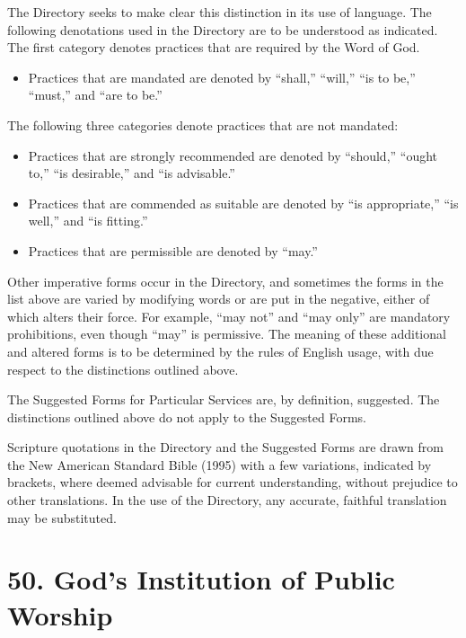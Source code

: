 \documentclass[
]{book}
\providecommand{\tightlist}{%
  \setlength{\itemsep}{0pt}\setlength{\parskip}{0pt}}
\begin{document}
The Directory seeks to make clear this distinction in its use of language. The following denotations used in the Directory are to be understood as indicated. The first category denotes practices that are required by the Word of God.

\begin{itemize}
\tightlist
\item
  Practices that are mandated are denoted by ``shall,'' ``will,'' ``is to be,'' ``must,'' and ``are to be.''
\end{itemize}

The following three categories denote practices that are not mandated:

\begin{itemize}
\item
  Practices that are strongly recommended are denoted by ``should,'' ``ought to,'' ``is desirable,'' and ``is advisable.''
\item
  Practices that are commended as suitable are denoted by ``is appropriate,'' ``is well,'' and ``is fitting.''
\item
  Practices that are permissible are denoted by ``may.''
\end{itemize}

Other imperative forms occur in the Directory, and sometimes the forms in the list above are varied by modifying words or are put in the negative, either of which alters their force. For example, ``may not'' and ``may only'' are mandatory prohibitions, even though ``may'' is permissive. The meaning of these additional and altered forms is to be determined by the rules of English usage, with due respect to the distinctions outlined above.

The Suggested Forms for Particular Services are, by definition, suggested. The distinctions outlined above do not apply to the Suggested Forms.

Scripture quotations in the Directory and the Suggested Forms are drawn from the New American Standard Bible (1995) with a few variations, indicated by brackets, where deemed advisable for current understanding, without prejudice to other translations. In the use of the Directory, any accurate, faithful translation may be substituted.

\hypertarget{gods-institution-of-public-worship}{%
\section*{50. God's Institution of Public Worship}\label{gods-institution-of-public-worship}}
\end{document}
